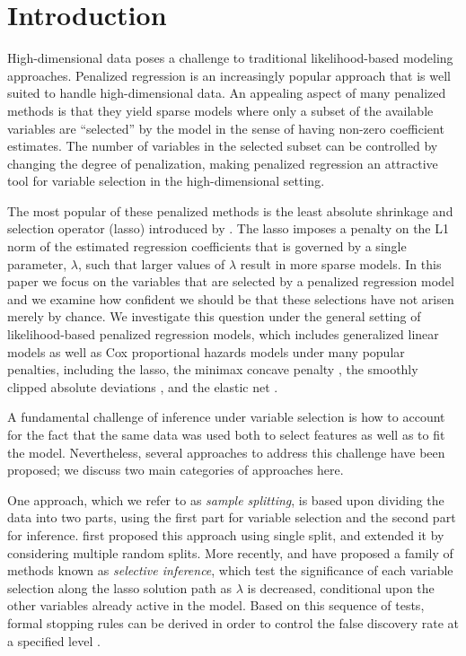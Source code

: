 \section{Introduction}

High-dimensional data poses a challenge to traditional likelihood-based modeling approaches.  Penalized regression is an increasingly popular approach that is well suited to handle high-dimensional data.  An appealing aspect of many penalized methods is that they yield sparse models where only a subset of the available variables are ``selected'' by the model in the sense of having non-zero coefficient estimates.  The number of variables in the selected subset can be controlled by changing the degree of penalization, making penalized regression an attractive tool for variable selection in the high-dimensional setting.

The most popular of these penalized methods is the least absolute shrinkage and selection operator (lasso) introduced by \citet{tibshirani_1996}. The lasso imposes a penalty on the L1 norm of the estimated regression coefficients that is governed by a single parameter, $\lambda$, such that larger values of $\lambda$ result in more sparse models. In this paper we focus on the variables that are selected by a penalized regression model and we examine how confident we should be that these selections have not arisen merely by chance.
We investigate this question under the general setting of likelihood-based penalized regression models, which includes generalized linear models as well as Cox proportional hazards models under many popular penalties, including the lasso, the minimax concave penalty \citep[MCP; ][]{MCP}, the smoothly clipped absolute deviations \citep[SCAD; ][]{SCAD}, and the elastic net \citep{Elastic_Net}.

A fundamental challenge of inference under variable selection is how to account for the fact that the same data was used both to select features as well as to fit the model.  Nevertheless, several approaches to address this challenge have been proposed; we discuss two main categories of approaches here.

One approach, which we refer to as {\em sample splitting}, is based upon dividing the data into two parts, using the first part for variable selection and the second part for inference. \citet{Sample_Splitting} first proposed this approach using single split, and \citet{Meinshausen2009} extended it by considering multiple random splits.  More recently, \citet{CovTest} and \citet{Selective_Inference} have proposed a family of methods known as {\em selective inference}, which test the significance of each variable selection along the lasso solution path as $\lambda$ is decreased, conditional upon the other variables already active in the model. Based on this sequence of tests, formal stopping rules can be derived in order to control the false discovery rate at a specified level \citep{GSell2016}.

